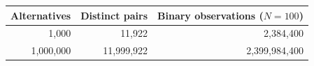 \begin{tabular}{rrr}
\toprule
Alternatives & Distinct pairs & Binary observations ($N=100$) \\
\midrule
1,000 & 11,922 & 2,384,400 \\
1,000,000 & 11,999,922 & 2,399,984,400 \\
\bottomrule
\end{tabular}
